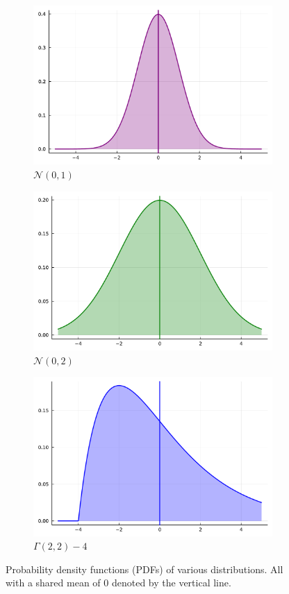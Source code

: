 \documentclass[10pt]{article}
\theoremstyle{plain}
\theoremstyle{remark}
\begin{document}
\begin{figure}[ht!]
        \begin{subfigure}[t]{0.5\textwidth}
                \centering
                \includegraphics[width=0.7\linewidth]{julia_figures/normal.pdf}
                \caption{$\mathcal{N}(0,1)$}\label{fig:normal}
        \end{subfigure}
        \begin{subfigure}[t]{0.5\textwidth}
                \centering
                \includegraphics[width=0.7\linewidth]{julia_figures/normal_wide.pdf}
                \caption{$\mathcal{N}(0,2)$}\label{fig:normal_wide}
        \end{subfigure}
        \begin{subfigure}[t]{1.0\textwidth}
                \centering
                \includegraphics[width=0.4\linewidth]{julia_figures/gamma.pdf}
                \caption{$\Gamma(2,2) - 4$}\label{fig:gamma}
        \end{subfigure}
        \caption{Probability density functions (PDFs) of various distributions. All with a shared mean of 0 denoted by the vertical line.}\label{fig:pdfs}
\end{figure}
\end{document}
